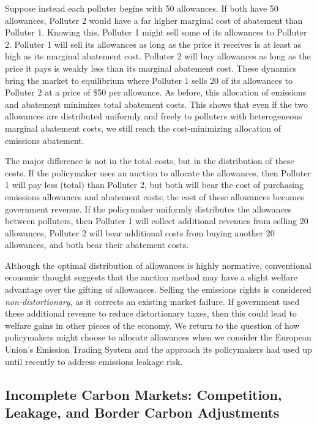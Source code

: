 Suppose instead each polluter begins with 50 allowances. If both have 50 allowances, Polluter 2 would have a far higher marginal cost of abatement than Polluter 1. Knowing this, Polluter 1 might sell some of its allowances to Polluter 2. Polluter 1 will sell its allowances as long as the price it receives is at least as high as its marginal abatement cost. Polluter 2 will buy allowances as long as the price it pays is weakly less than its marginal abatement cost. These dynamics bring the market to equilibrium where Polluter 1 sells 20 of its allowances to Polluter 2 at a price of \$50 per allowance. As before, this allocation of emissions and abatement minimizes total abatement costs. This shows that even if the two allowances are distributed uniformly and freely to polluters with heterogeneous marginal abatement costs, we still reach the cost-minimizing allocation of emissions abatement. 

The major difference is not in the total costs, but in the distribution of these costs. If the policymaker uses an auction to allocate the allowances, then Polluter 1 will pay less (total) than Polluter 2, but both will bear the cost of purchasing emissions allowances and abatement costs; the cost of these allowances becomes government revenue. If the policymaker uniformly distributes the allowances between polluters, then Polluter 1 will collect additional revenues from selling 20 allowances, Polluter 2 will bear additional costs from buying another 20 allowances, and both bear their abatement costs. 

Although the optimal distribution of allowances is highly normative, conventional economic thought suggests that the auction method may have a slight welfare advantage over the gifting of allowances. Selling the emissions rights is considered \emph{non-distortionary}, as it corrects an existing market failure. If government used these additional revenue to reduce distortionary taxes, then this could lead to welfare gains in other pieces of the economy. We return to the question of how policymakers might choose to allocate allowances when we consider the European Union's Emission Trading System and the approach its policymakers had used up until recently to address emissions leakage risk.


\subsection{Incomplete Carbon Markets: Competition, Leakage, and Border Carbon Adjustments}

